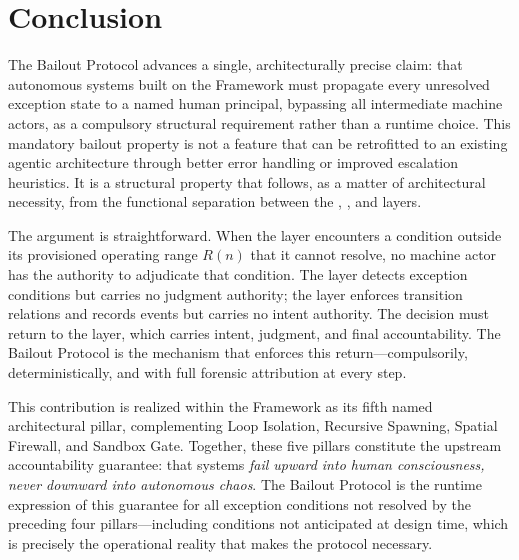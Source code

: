 \section{Conclusion}
\label{sec:conclusion}

The Bailout Protocol advances a single, architecturally precise claim: that autonomous systems built on the \bxthree{} Framework must propagate every unresolved exception state to a named human principal, bypassing all intermediate machine actors, as a compulsory structural requirement rather than a runtime choice. This mandatory bailout property is not a feature that can be retrofitted to an existing agentic architecture through better error handling or improved escalation heuristics. It is a structural property that follows, as a matter of architectural necessity, from the functional separation between the \purpose{}, \bounds{}, and \fact{} layers.

The argument is straightforward. When the \bounds{} layer encounters a condition outside its provisioned operating range $R(n)$ that it cannot resolve, no machine actor has the authority to adjudicate that condition. The \bounds{} layer detects exception conditions but carries no judgment authority; the \fact{} layer enforces transition relations and records events but carries no intent authority. The decision must return to the \purpose{} layer, which carries intent, judgment, and final accountability. The Bailout Protocol is the mechanism that enforces this return---compulsorily, deterministically, and with full forensic attribution at every step.

This contribution is realized within the \bxthree{} Framework as its fifth named architectural pillar, complementing Loop Isolation, Recursive Spawning, Spatial Firewall, and Sandbox Gate. Together, these five pillars constitute the upstream accountability guarantee: that \bxthree{} systems \emph{fail upward into human consciousness, never downward into autonomous chaos}. The Bailout Protocol is the runtime expression of this guarantee for all exception conditions not resolved by the preceding four pillars---including conditions not anticipated at design time, which is precisely the operational reality that makes the protocol necessary.


